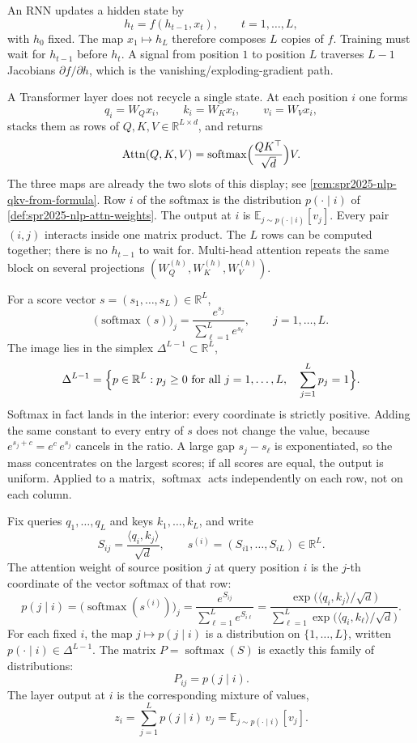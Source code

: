 \documentclass[11pt,a4paper]{article}
\DeclareMathOperator{\softmax}{softmax}
\theoremstyle{definition}
\begin{document}
An RNN updates a hidden state by
\[
h_t=f(h_{t-1},x_t),\qquad t=1,\ldots,L,
\]
with \(h_0\) fixed. The map \(x_1\mapsto h_L\) therefore composes \(L\) copies of \(f\). Training must wait for \(h_{t-1}\) before \(h_t\). A signal from position \(1\) to position \(L\) traverses \(L-1\) Jacobians \(\partial f/\partial h\), which is the vanishing/exploding-gradient path.

A Transformer layer does not recycle a single state. At each position \(i\) one forms
\[
q_i=W_Q x_i,\qquad k_i=W_K x_i,\qquad v_i=W_V x_i,
\]
stacks them as rows of \(Q,K,V\in\mathbb{R}^{L\times d}\), and returns
\[
\mathrm{Attn}(Q,K,V)
=\softmax\Bigl(\frac{QK^\top}{\sqrt{d}}\Bigr)V.
\]
The three maps are already the two slots of this display; see \cref{rem:spr2025-nlp-qkv-from-formula}. Row \(i\) of the softmax is the distribution \(p(\cdot\mid i)\) of \cref{def:spr2025-nlp-attn-weights}. The output at \(i\) is \(\mathbb{E}_{j\sim p(\cdot\mid i)}[v_j]\). Every pair \((i,j)\) interacts inside one matrix product. The \(L\) rows can be computed together; there is no \(h_{t-1}\) to wait for. Multi-head attention repeats the same block on several projections \((W_Q^{(h)},W_K^{(h)},W_V^{(h)})\).

\begin{definition}[Softmax]
\label{def:spr2025-nlp-softmax}
For a score vector \(s=(s_1,\ldots,s_L)\in\mathbb{R}^L\),
\[
\bigl(\softmax(s)\bigr)_j
=\frac{e^{s_j}}{\sum_{\ell=1}^{L}e^{s_\ell}},
\qquad j=1,\ldots,L.
\]
The image lies in the simplex \(\Delta^{L-1}\subset\mathbb{R}^L\),
\[
\Delta^{L-1}
=\Bigl\{ p\in\mathbb{R}^L :
p_j\ge 0\text{ for all }j=1,\ldots,L,\quad
\sum_{j=1}^{L}p_j=1
\Bigr\}.
\]
Softmax in fact lands in the interior: every coordinate is strictly positive. Adding the same constant to every entry of \(s\) does not change the value, because \(e^{s_j+c}=e^c\,e^{s_j}\) cancels in the ratio. A large gap \(s_j-s_\ell\) is exponentiated, so the mass concentrates on the largest scores; if all scores are equal, the output is uniform. Applied to a matrix, \(\softmax\) acts independently on each row, not on each column.
\end{definition}

\begin{definition}
\label{def:spr2025-nlp-attn-weights}
Fix queries \(q_1,\ldots,q_L\) and keys \(k_1,\ldots,k_L\), and write
\[
S_{ij}
=\frac{\langle q_i,k_j\rangle}{\sqrt{d}},
\qquad
s^{(i)}
=(S_{i1},\ldots,S_{iL})\in\mathbb{R}^{L}.
\]
The attention weight of source position \(j\) at query position \(i\) is the \(j\)-th coordinate of the vector softmax of that row:
\[
p(j\mid i)
=\bigl(\softmax(s^{(i)})\bigr)_j
=\frac{e^{S_{ij}}}{\sum_{\ell=1}^{L}e^{S_{i\ell}}}
=\frac{\exp\bigl(\langle q_i,k_j\rangle/\sqrt{d}\bigr)}{\sum_{\ell=1}^{L}\exp\bigl(\langle q_i,k_\ell\rangle/\sqrt{d}\bigr)}.
\]
For each fixed \(i\), the map \(j\mapsto p(j\mid i)\) is a distribution on \(\{1,\ldots,L\}\), written \(p(\cdot\mid i)\in\Delta^{L-1}\). The matrix \(P=\softmax(S)\) is exactly this family of distributions:
\[
P_{ij}=p(j\mid i).
\]
The layer output at \(i\) is the corresponding mixture of values,
\[
z_i
=\sum_{j=1}^{L}p(j\mid i)\,v_j
=\mathbb{E}_{j\sim p(\cdot\mid i)}[v_j].
\]
\end{definition}
\end{document}

